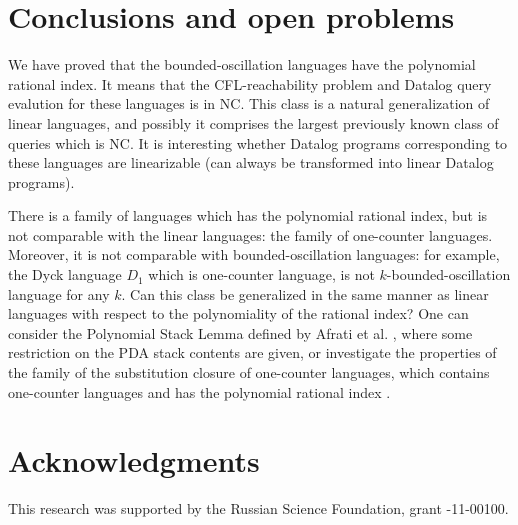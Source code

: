 \documentclass{ws-ijfcs}
\begin{document}
\section{Conclusions and open problems}
\label{sec:conc}

We have proved that the bounded-oscillation languages have the polynomial rational index. It means that the CFL-reachability problem and Datalog query evalution for these languages is in NC. This class is a natural generalization of linear languages, and possibly it comprises the largest previously known class of queries which is NC. It is interesting whether Datalog programs corresponding to these languages are linearizable (can always be transformed into linear Datalog programs).


There is a family of languages which has the polynomial rational index, but is not comparable with the linear languages: the family of one-counter languages. Moreover, it is not comparable with bounded-oscillation languages: for example, the Dyck language $D_1$ which is one-counter language, is not $k$-bounded-oscillation language for any $k$. Can this class be generalized in the same manner as linear languages with respect to the polynomiality of the rational index? One can consider the Polynomial Stack Lemma defined by Afrati et al. \cite{ChainQ}, where some restriction on the PDA stack contents are given, or investigate the properties of the family of the substitution closure of one-counter languages, which contains one-counter languages and has the polynomial rational index \cite{RatBasic}. 




\section*{Acknowledgments}
This research was supported by the Russian Science Foundation, grant -11-00100.



  

\end{document}
